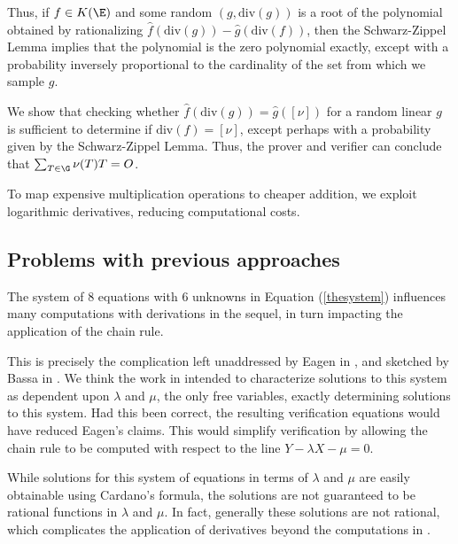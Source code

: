 \documentclass[11pt,letterpaper]{article}
\theoremstyle{definition}
\newcommand{\6}{\mathbf}
\newcommand{\7}{\mathcal}
\begin{document}
Thus, if $f \in K(\E)$ and some random $(g, \text{div}(g))$ is a root of the polynomial obtained by rationalizing $\widehat{f}(\text{div}(g)) - \widehat{g}(\text{div}(f))$, then the Schwarz-Zippel Lemma implies that the polynomial is the zero polynomial exactly, except with a probability inversely proportional to the cardinality of the set from which we sample $g$.

We show that checking whether $\widehat{f}(\text{div}(g)) = \widehat{g}([\nu])$ for a random linear $g$ is sufficient to determine if $\text{div}(f) = [\nu]$, except perhaps with a probability given by the Schwarz-Zippel Lemma. Thus, the prover and verifier can conclude that $\sum_{T \in \G} \nu(T) T = O$. 

To map expensive multiplication operations to cheaper addition, we exploit logarithmic derivatives, reducing computational costs.


\subsection{Problems with previous approaches}
The system of $8$ equations with $6$ unknowns in Equation (\ref{thesystem}) influences many computations with derivations in the sequel, in turn impacting the application of the chain rule. %

This is precisely the complication left unaddressed by Eagen in \cite{Eagen}, and sketched by Bassa in \cite{SoundnessForDLP}.  We think the work in \cite{Eagen} intended to characterize solutions to this system as dependent upon $\lambda$ and $\mu$, the only free variables, exactly determining solutions to this system. Had this been correct, the resulting verification equations would have reduced Eagen's claims. This would simplify verification by allowing the chain rule to be computed with respect to the line $Y - \lambda X - \mu = 0$.

While solutions for this system of equations in terms of $\lambda$ and $\mu$ are easily obtainable using Cardano's formula, the solutions are not guaranteed to be rational functions in $\lambda$ and $\mu$. In fact, generally these solutions are not rational, which complicates the application of derivatives beyond the computations in \cite{Eagen}.
\end{document}
